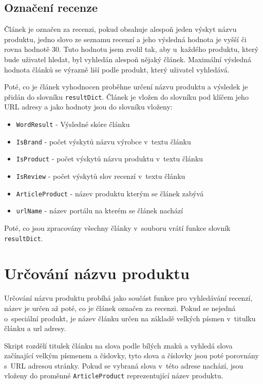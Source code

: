 \subsection*{Označení recenze}
Článek je označen za recenzi, pokud obsahuje alespoň jeden výskyt názvu produktu, jedno slovo ze seznamu recenzí a jeho výsledná hodnota je vyšší či rovna hodnotě 30. Tuto hodnotu jsem zvolil tak, aby u~každého produktu, který bude uživatel hledat, byl vyhledán alespoň nějaký článek. Maximální výsledná hodnota článků se výrazně liší podle produkt, který uživatel vyhledává. 

Poté, co je článek vyhodnocen proběhne určení názvu produktu a výsledek je přidán do slovníku \verb|resultDict|. Článek je vložen do slovníku pod klíčem jeho URL adresy a jako hodnoty jsou do slovníku vloženy:
\begin{itemize}
    \item \verb|WordResult| - Výsledné skóre článku 
    \item \verb|IsBrand| - počet výskytů názvu výrobce v~textu článku
    \item \verb|IsProduct| - počet výskytů názvu produktu v~textu článku 
    \item \verb|IsReview| - počet výskytů slov recenzí v~textu článku
    \item \verb|ArticleProduct| - název produktu kterým se článek zabývá
    \item \verb|urlName| - název portálu na kterém se článek nachází
\end{itemize}

Poté, co jsou zpracovány všechny články v~souboru vrátí funkce slovník \verb|resultDict|.

\section{Určování názvu produktu}

Určování názvu produktu probíhá jako součást funkce pro vyhledávání recenzí, název je určen až poté, co je článek označen za recenzi. Pokud se nejedná o~speciální produkt, je název článku určen na základě velkých písmen v~titulku článku a url adresy.

Skript rozdělí titulek článku na slova podle bílých znaků a vyhledá slova začínající velkým písmenem a číslovky, tyto slova a číslovky jsou poté porovnány s~URL adresou stránky. Pokud se vybraná slova v~této adrese nachází, jsou vloženy do proměnné \verb|ArticleProduct| reprezentující název produktu.

